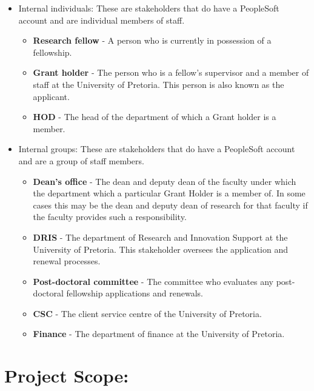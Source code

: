 \documentclass[12pt]{article}
\begin{document}
\begin{itemize}
\item Internal individuals:
These are stakeholders that do have a PeopleSoft account and are individual members of staff.
\begin{itemize}	
\item \textbf{Research fellow} - A person who is currently in possession of a fellowship.
\item \textbf{Grant holder} - The person who is a fellow's supervisor and a member of staff at the University of Pretoria. This person is also known as the applicant.
\item \textbf{HOD} - The head of the department of which a Grant holder is a member.
\end{itemize}
\item Internal groups:
These are stakeholders that do have a PeopleSoft account and are a group of staff members.
\begin{itemize}	
\item \textbf{Dean's office} - The dean and deputy dean of the faculty under which the department which a particular Grant Holder is a member of. In some cases this may be the dean and deputy dean of research for that faculty if the faculty provides such a responsibility.
\item \textbf{DRIS} - The department of Research and Innovation Support at the University of Pretoria. This stakeholder oversees the application and renewal processes.
\item \textbf{Post-doctoral committee} - The committee who evaluates any post-doctoral fellowship applications and renewals.
\item \textbf{CSC} - The client service centre of the University of Pretoria.
\item \textbf{Finance} - The department of finance at the University of Pretoria.
\end{itemize}
\end{itemize}
\vspace{0.5in}

\newpage
\section{Project Scope:}
\vspace{0.2in}
	
\end{document}
